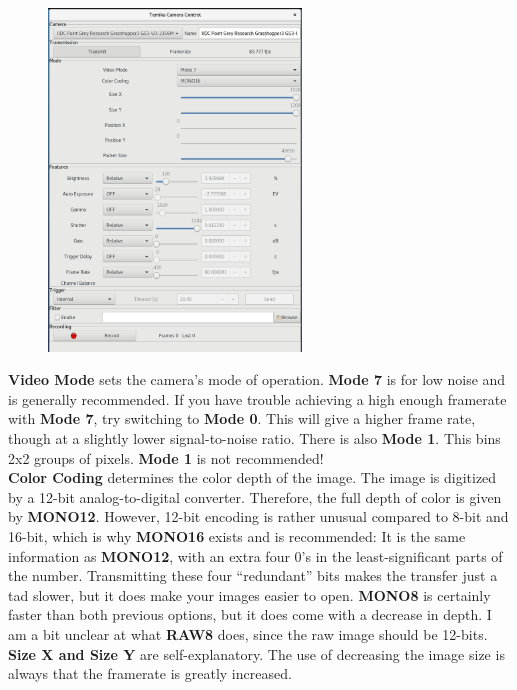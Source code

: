 \documentclass{report}
\begin{document}
\begin{figure}[h!]
\centering
\includegraphics[width=0.60\textwidth]{grasshopper}
\end{figure}

\textbf{Video Mode} sets the camera's mode of operation. \textbf{Mode 7} is for low noise and is generally recommended. If you have trouble achieving a high enough framerate with \textbf{Mode 7}, try switching to \textbf{Mode 0}. This will give a higher frame rate, though at a slightly lower signal-to-noise ratio. There is also \textbf{Mode 1}. This bins 2x2 groups of pixels. \textbf{Mode 1} is not recommended!\\

\textbf{Color Coding} determines the color depth of the image. The image is digitized by a 12-bit analog-to-digital converter. Therefore, the full depth of color is given by \textbf{MONO12}. However, 12-bit encoding is rather unusual compared to 8-bit and 16-bit, which is why \textbf{MONO16} exists and is recommended: It is the same information as \textbf{MONO12}, with an extra four $0$'s in the least-significant parts of the number. Transmitting these four ``redundant'' bits makes the transfer just a tad slower, but it does make your images easier to open. \textbf{MONO8} is certainly faster than both previous options, but it does come with a decrease in depth. I am a bit unclear at what \textbf{RAW8} does, since the raw image should be 12-bits.\\

\textbf{Size X and Size Y} are self-explanatory. The use of decreasing the image size is always that the framerate is greatly increased.\\
\end{document}
